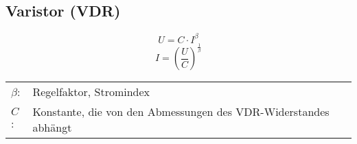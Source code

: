 



\subsection{Varistor (VDR)}

\[ U = C \cdot I^{\beta} \]
\[ I = \left(\frac{U}{C}\right)^{\frac{1}{\beta}} \]
\begin{tabular}{@{}lp{}}
  $\beta$: & Regelfaktor, Stromindex \\
  $C$:     & Konstante, die von den Abmessungen des VDR-Widerstandes abhängt
\end{tabular}
